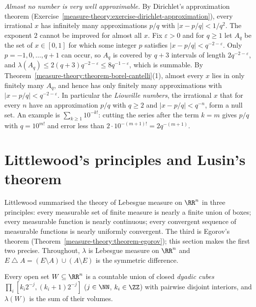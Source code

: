 \begin{example}\label{measure-theory:example-diophantine}
\emph{Almost no number is very well approximable.} By Dirichlet's approximation theorem (Exercise~\ref{measure-theory:exercise-dirichlet-approximation}), every irrational $x$ has infinitely many
approximations $p/q$ with $|x - p/q| < 1/q^2$. The exponent $2$ cannot be improved for almost all $x$. Fix $\varepsilon > 0$ and for $q \geq 1$ let $A_q$ be the set of $x \in [0, 1]$ for which some integer
$p$ satisfies $|x - p/q| < q^{-2-\varepsilon}$. Only $p = -1, 0, \ldots, q + 1$ can occur, so $A_q$ is covered by $q + 3$ intervals of length $2q^{-2-\varepsilon}$, and
$\lambda(A_q) \leq 2(q + 3)q^{-2-\varepsilon} \leq 8q^{-1-\varepsilon}$, which is summable. By Theorem~\ref{measure-theory:theorem-borel-cantelli}(1), almost every $x$ lies in only finitely many $A_q$, and
hence has only finitely many approximations with $|x - p/q| < q^{-2-\varepsilon}$. In particular the \emph{Liouville numbers}, the irrational $x$ that for every $n$ have an approximation $p/q$ with $q \geq 2$ and
$|x - p/q| < q^{-n}$, form a null set. An example is $\sum_{k \geq 1}10^{-k!}$: cutting the series after the term $k = m$ gives $p/q$ with $q = 10^{m!}$ and error less than
$2 \cdot 10^{-(m+1)!} = 2q^{-(m+1)}$.
\end{example}

\section{Littlewood's principles and Lusin's theorem}\label{measure-theory:section-lusin}

Littlewood summarised the theory of Lebesgue measure on $\RR^n$ in three principles: every measurable set of finite measure is nearly a finite union of boxes;
every measurable function is nearly continuous; every convergent sequence of measurable functions is nearly uniformly convergent. The third is Egorov's
theorem (Theorem~\ref{measure-theory:theorem-egorov}); this section makes the first two precise. Throughout, $\lambda$ is Lebesgue measure on $\RR^n$ and
$E \mathbin{\triangle} A = (E \setminus A) \cup (A \setminus E)$ is the symmetric difference.

\begin{lemma}\label{measure-theory:lemma-dyadic-cubes}
Every open set $W \subseteq \RR^n$ is a countable union of closed \emph{dyadic cubes} $\prod_i[k_i2^{-j}, (k_i + 1)2^{-j}]$ ($j \in \NN$, $k_i \in \ZZ$) with pairwise
disjoint interiors, and $\lambda(W)$ is the sum of their volumes.
\end{lemma}

